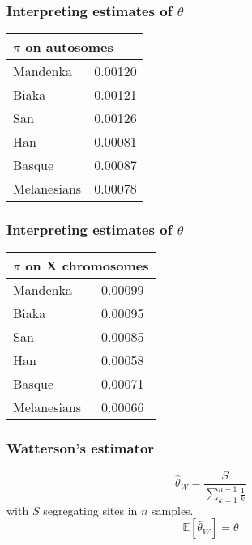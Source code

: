 \documentclass{beamer}
\newcommand{\E}{\mathbb{E}}
\newcommand{\1}{\ensuremath{\mathbf{1}}}
\begin{document}
%
%
%
\begin{frame}\frametitle{Interpreting estimates of $\theta$}
	\begin{center}
		\begin{tabular}{ll}
			\toprule
			\multicolumn{2}{l}{$\pi$ on autosomes}	\\
			\midrule
			Mandenka	& 0.00120	\\
			Biaka		& 0.00121	\\
			San			& 0.00126	\\
			Han			& 0.00081	\\
			Basque		& 0.00087	\\
			Melanesians	& 0.00078	\\
			\bottomrule
	   	\end{tabular}	
	\end{center}
\end{frame}
%
%
%
\begin{frame}\frametitle{Interpreting estimates of $\theta$}
	\begin{center}
		\begin{tabular}{ll}
			\toprule
			\multicolumn{2}{l}{$\pi$ on X chromosomes}	\\
			\midrule
			Mandenka	& 0.00099	\\
			Biaka		& 0.00095	\\
			San			& 0.00085	\\
			Han			& 0.00058	\\
			Basque		& 0.00071	\\
			Melanesians	& 0.00066	\\
			\bottomrule
	   	\end{tabular}	
	\end{center}
\end{frame}
%
%
%
\begin{frame}\frametitle{Watterson’s estimator}
	\begin{equation}
		\hat{\theta}_W = \frac{S}{\sum_{k=1}^{n-1}\tfrac{1}{k}}
	\end{equation}
	with $S$ segregating sites in $n$ samples.
	\begin{equation}
		\E [\hat{\theta}_W] = \theta
	\end{equation}
\end{frame}
\end{document}
